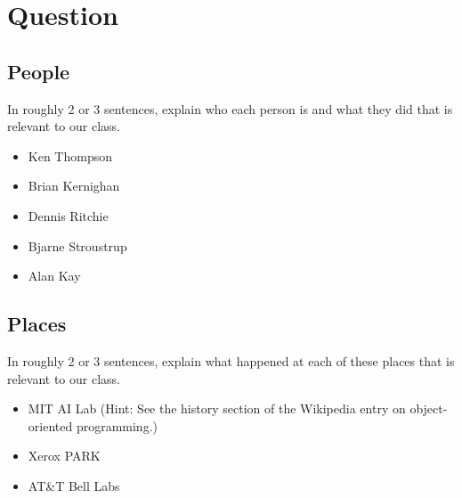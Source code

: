 




\docCopyright

\section{Question}

\subsection*{People}
In roughly 2 or 3 sentences, explain who each person is and what they did that
is relevant to our class.
\textQuestion{\makeDashedLine}
\begin{itemize}
  \item Ken Thompson
    \vfill\textQuestion{\makeDashedLine}
  \item Brian Kernighan
    \vfill\textQuestion{\makeDashedLine}
  \item Dennis Ritchie
    \vfill\textQuestion{\makeDashedLine}
  \item Bjarne Stroustrup
    \vfill\textQuestion{\makeDashedLine}
  \item Alan Kay
    \vfill
\end{itemize}

\newpage

\subsection*{Places}
In roughly 2 or 3 sentences, explain what happened at each of these places that is relevant to our class.
\textQuestion{\makeDashedLine}
\begin{itemize}
  \item MIT AI Lab (Hint: See the history section of the Wikipedia entry on
    object-oriented programming.)
    \vfill\textQuestion{\makeDashedLine}
  \item Xerox PARK
    \vfill\textQuestion{\makeDashedLine}
  \item AT\&T Bell Labs
    \vfill
\end{itemize}

